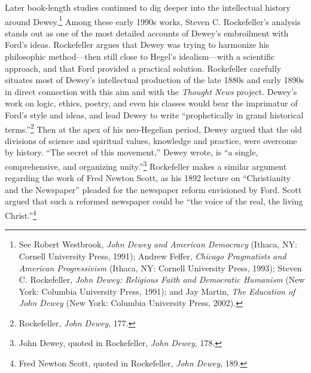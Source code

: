 \documentclass[twoside,symmetric,nobib,justified]{tufte-book}
\begin{document}
Later book-length studies continued to dig deeper into the intellectual
history around Dewey.\footnote{See Robert Westbrook, \emph{John Dewey
  and American Democracy} (Ithaca, NY: Cornell University Press, 1991);
  Andrew Feffer, \emph{Chicago Pragmatists and American Progressivism}
  (Ithaca, NY: Cornell University Press, 1993); Steven C. Rockefeller,
  \emph{John Dewey: Religious Faith and Democratic Humanism} (New York:
  Columbia University Press, 1991); and Jay Martin, \emph{The Education
  of John Dewey} (New York: Columbia University Press, 2002).} Among
these early 1990s works, Steven C. Rockefeller's analysis stands out as
one of the most detailed accounts of Dewey's embroilment with Ford's
ideas. Rockefeller argues that Dewey was trying to harmonize his
philosophic method---then still close to Hegel's idealism---with a
scientific approach, and that Ford provided a practical solution.
Rockefeller carefully situates most of Dewey's intellectual production
of the late 1880s and early 1890s in direct connection with this aim and
with the \emph{Thought News} project. Dewey's work on logic, ethics,
poetry, and even his classes would bear the imprimatur of Ford's style
and ideas, and lead Dewey to write ``prophetically in grand historical
terms.''\footnote{Rockefeller, \emph{John Dewey}, 177.} Then at the apex
of his neo-Hegelian period, Dewey argued that the old divisions of
science and spiritual values, knowledge and practice, were overcome by
history. ``The secret of this movement,'' Dewey wrote, is ``a single,
comprehensive, and organizing unity.''\footnote{John Dewey, quoted in
  Rockefeller, \emph{John Dewey}, 178.} Rockefeller makes a similar
argument regarding the work of Fred Newton Scott, as his 1892 lecture on
``Christianity and the Newspaper'' pleaded for the newspaper reform
envisioned by Ford. Scott argued that such a reformed newspaper could be
``the voice of the real, the living Christ.''\footnote{Fred Newton
  Scott, quoted in Rockefeller, \emph{John Dewey}, 189.}
\end{document}
